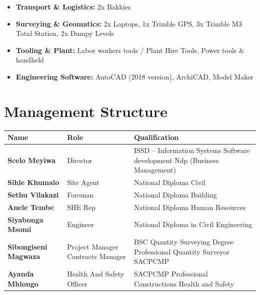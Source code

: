 \documentclass[a4paper,11pt]{article}
\providecommand{\faCogs}{\faCog}
\begin{document}
\begin{tcolorbox}[
  enhanced, colback=white, colframe=awenMaroon, 
  boxrule=0.8pt, arc=4pt, top=10pt, bottom=10pt, left=12pt, right=12pt
]
\begin{itemize}[label=\textcolor{awenGold}{\faCogs}, itemsep=6pt, font=\color{awenDarkGrey}]
  \item \textbf{Transport \& Logistics:} 2x Bakkies
  \item \textbf{Surveying \& Geomatics:} 2x Laptops, 1x Trimble GPS, 3x Trimble M3 Total Station, 2x Dumpy Levels
  \item \textbf{Tooling \& Plant:} Labor workers tools / Plant Hire Tools, Power tools \& handheld
  \item \textbf{Engineering Software:} AutoCAD (2018 version), ArchiCAD, Model Maker
\end{itemize}
\end{tcolorbox}

\vspace{0.6cm}

\section{Management Structure}

{\color{awenDarkGrey}
\renewcommand{\arraystretch}{1.45}
\begin{tabularx}{\textwidth}{@{} L{4.2cm} L{3.8cm} X @{}}
  \toprule
  \textcolor{awenWhite}{\bfseries Name} & 
  \textcolor{awenWhite}{\bfseries Role} & 
  \textcolor{awenWhite}{\bfseries Qualification} \\
  \midrule
  \textbf{Scelo Meyiwa}      & Director & ISSD – Information Systems Software development \newline Ndp (Business Management) \\
  \textbf{Sihle Khumalo}     & Site Agent & National Diploma Civil \\
  \textbf{Sethu Vilakazi}    & Foreman & National Diploma Building \\
  \textbf{Anele Tembe}       & SHE Rep & National Diploma Human Resources \\
  \textbf{Siyabonga Msomi}   & Engineer & National Diploma in Civil Engineering \\
  \textbf{Sibongiseni Magwaza} & Project Manager \newline Contracts Manager & BSC Quantity Surveying Degree \newline Professional Quantity Surveyor \newline SACPCMP \\
  \textbf{Ayanda Mhlongo}    & Health And Safety Officer & SACPCMP \newline Professional Constructions Health and Safety \\
  \bottomrule
\end{tabularx}
}
\end{document}
